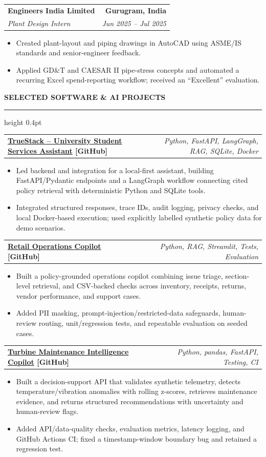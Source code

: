 \documentclass[10pt,a4paper]{article}
\makeatletter
\newcommand{\ressection}[1]{%
  \vspace{4.8pt}%
  {\fontsize{10.2}{11.2}\selectfont\bfseries\MakeUppercase{#1}}\par
  \vspace{2.3pt}\hrule height 0.4pt\vspace{3.6pt}%
}
\newcommand{\entryheading}[4]{%
  \begin{tabular*}{\textwidth}{@{\extracolsep{\fill}}lr}
    \textbf{#1} & \textbf{#2}\\
    \textit{#3} & \textit{#4}
  \end{tabular*}\par
}
\newcommand{\projectheading}[3]{%
  \begin{tabular*}{\textwidth}{@{\extracolsep{\fill}}lr}
    \textbf{\href{#2}{#1} \textcolor{linkblue}{[GitHub]}} & {\textit{\fontsize{8.2}{9.1}\selectfont #3}}
  \end{tabular*}\par
}
\newenvironment{resbullets}{%
  \begin{itemize}[leftmargin=11pt,label=\textbullet,itemsep=0pt,topsep=1.2pt,parsep=0pt,partopsep=0pt]
  \fontsize{9.55}{10.95}\selectfont
}{\end{itemize}\vspace{1pt}}
\makeatother
\begin{document}
\entryheading{Engineers India Limited}{Gurugram, India}{Plant Design Intern}{Jun 2025 -- Jul 2025}
\begin{resbullets}
  \item Created plant-layout and piping drawings in AutoCAD using ASME/IS standards and senior-engineer feedback.
  \item Applied GD\&T and CAESAR II pipe-stress concepts and automated a recurring Excel spend-reporting workflow; received an ``Excellent'' evaluation.
\end{resbullets}

\ressection{Selected Software \& AI Projects}
\projectheading{TrueStack -- University Student Services Assistant}{https://github.com/Nothing0g/TrueStack_HCLTech_aiHackathon}{Python, FastAPI, LangGraph, RAG, SQLite, Docker}
\begin{resbullets}
  \item Led backend and integration for a local-first assistant, building FastAPI/Pydantic endpoints and a LangGraph workflow connecting cited policy retrieval with deterministic Python and SQLite tools.
  \item Integrated structured responses, trace IDs, audit logging, privacy checks, and local Docker-based execution; used explicitly labelled synthetic policy data for demo scenarios.
\end{resbullets}

\projectheading{Retail Operations Copilot}{https://github.com/Nothing0g/testing_case}{Python, RAG, Streamlit, Tests, Evaluation}
\begin{resbullets}
  \item Built a policy-grounded operations copilot combining issue triage, section-level retrieval, and CSV-backed checks across inventory, receipts, returns, vendor performance, and support cases.
  \item Added PII masking, prompt-injection/restricted-data safeguards, human-review routing, unit/regression tests, and repeatable evaluation on seeded cases.
\end{resbullets}

\projectheading{Turbine Maintenance Intelligence Copilot}{https://github.com/Nothing0g/turbine-maintenance-copilot}{Python, pandas, FastAPI, Testing, CI}
\begin{resbullets}
  \item Built a decision-support API that validates synthetic telemetry, detects temperature/vibration anomalies with rolling z-scores, retrieves maintenance evidence, and returns structured recommendations with uncertainty and human-review flags.
  \item Added API/data-quality checks, evaluation metrics, latency logging, and GitHub Actions CI; fixed a timestamp-window boundary bug and retained a regression test.
\end{resbullets}
\end{document}
